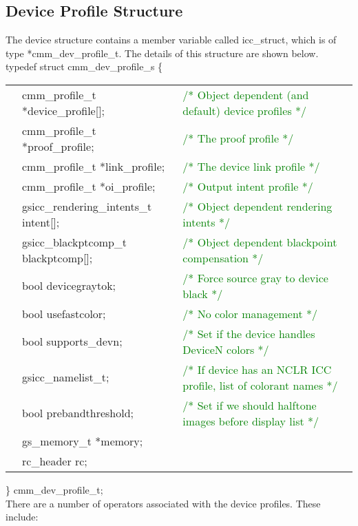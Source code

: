 \documentclass[12pt,notitlepage]{article}
\begin{document}
\subsection{Device Profile Structure}

The device structure contains a member variable called icc\_struct, which is of type *cmm\_dev\_profile\_t.  The details
of this structure are shown below.\\

\noindent typedef struct cmm\_dev\_profile\_s \{

\begin{tabular}{lll}
 & cmm\_profile\_t  *device\_profile[]; & \textcolor{green}{/* Object dependent (and default) device profiles */}  \\
 & cmm\_profile\_t  *proof\_profile; & \textcolor{green}{/* The proof profile */}  \\
 & cmm\_profile\_t  *link\_profile; & \textcolor{green}{/* The device link profile */}  \\
 & cmm\_profile\_t  *oi\_profile; & \textcolor{green}{/* Output intent profile */}  \\
 & gsicc\_rendering\_intents\_t intent[]; & \textcolor{green}{/* Object dependent rendering intents */}  \\
 & gsicc\_blackptcomp\_t blackptcomp[]; & \textcolor{green}{/* Object dependent blackpoint compensation */}  \\
 & bool devicegraytok;    &    \textcolor{green}{/* Force source gray to device black */}  \\
 & bool usefastcolor;     &   \textcolor{green}{/* No color management */} \\
 & bool supports\_devn;     &   \textcolor{green}{/* Set if the device handles DeviceN colors */} \\
 & gsicc\_namelist\_t; & \textcolor{green}{/* If device has an NCLR ICC profile, list of colorant names */} \\
 & bool prebandthreshold;     &   \textcolor{green}{/* Set if we should halftone images before display list */} \\
  &       gs\_memory\_t *memory;    & \\
  &       rc\_header rc; &
\end{tabular}

\noindent  \}  cmm\_dev\_profile\_t;\\

There are a number of operators associated with the device profiles.  These include:\\
\end{document}
